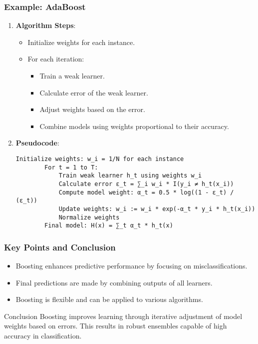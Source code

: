 \documentclass{beamer}
\begin{document}
\begin{frame}[fragile]
    \frametitle{Example: AdaBoost}
    \begin{enumerate}
        \item \textbf{Algorithm Steps}:
        \begin{itemize}
            \item Initialize weights for each instance.
            \item For each iteration:
            \begin{itemize}
                \item Train a weak learner.
                \item Calculate error of the weak learner.
                \item Adjust weights based on the error.
                \item Combine models using weights proportional to their accuracy.
            \end{itemize}
        \end{itemize}
        
        \item \textbf{Pseudocode}:
        \begin{lstlisting}[basicstyle=\footnotesize]
        Initialize weights: w_i = 1/N for each instance
        For t = 1 to T:
            Train weak learner h_t using weights w_i
            Calculate error ε_t = ∑_i w_i * I(y_i ≠ h_t(x_i))
            Compute model weight: α_t = 0.5 * log((1 - ε_t) / (ε_t))
            Update weights: w_i := w_i * exp(-α_t * y_i * h_t(x_i))
            Normalize weights
        Final model: H(x) = ∑_t α_t * h_t(x)
        \end{lstlisting}
    \end{enumerate}
\end{frame}

\begin{frame}[fragile]
    \frametitle{Key Points and Conclusion}
    \begin{itemize}
        \item Boosting enhances predictive performance by focusing on misclassifications.
        \item Final predictions are made by combining outputs of all learners.
        \item Boosting is flexible and can be applied to various algorithms.
    \end{itemize}

    \begin{block}{Conclusion}
        Boosting improves learning through iterative adjustment of model weights based on errors.
        This results in robust ensembles capable of high accuracy in classification.
    \end{block}
\end{frame}
\end{document}

